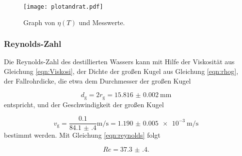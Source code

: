 \begin{figure}
  \centering
  \texttt{[image: plotandrat.pdf]}
  \caption{Graph von $\eta(T)$ und Messwerte.}
  \label{fig:VisTemp}
\end{figure}

\subsubsection{Reynolds-Zahl}

Die Reynolds-Zahl des destillierten Wassers kann mit Hilfe der Viskosität aus
Gleichung \eqref{eqn:Viskosi}, der Dichte der großen Kugel aus Gleichung
\eqref{eqn:rhog},
der Fallrohrdicke, die etwa dem Durchmesser der großen Kugel

\begin{equation}
  d_\text{g} = 2 r_\text{g} = \SI{15.816(2)}{\milli\meter}
\end{equation}
entspricht, und der Geschwindigkeit der großen Kugel

\begin{equation}
  v_\text{g} = \frac{0.1}{\num{84.1(4)}}\si{\meter\per\second} =
  \SI{1.190(5)e-3}{\meter\per\second}
\end{equation}
bestimmt werden.
Mit Gleichung \eqref{eqn:reynolds} folgt

\begin{equation}
  Re = \num{37.3(4)}.
\end{equation}
